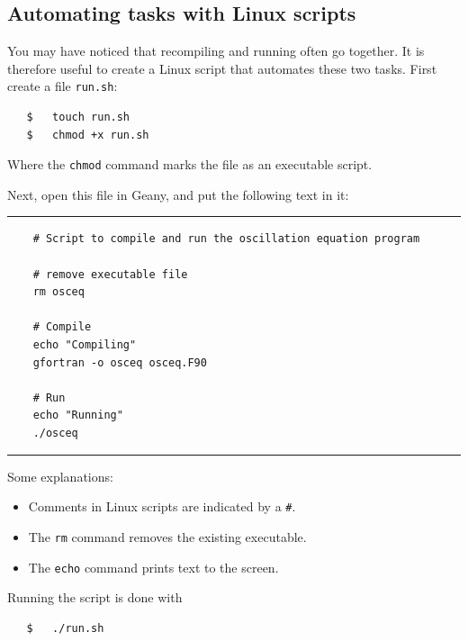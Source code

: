 \documentclass[a4paper]{article}
\begin{document}
\subsection{Automating tasks with Linux scripts}
%
\par
You may have noticed that recompiling and running often go together. It is therefore useful to create a Linux script that automates these two tasks. First create a file \texttt{run.sh}:
%
\begin{verbatim}
   $   touch run.sh
   $   chmod +x run.sh
\end{verbatim}
%
Where the \verb+chmod+ command marks the file as an executable script.
%
\par
Next, open this file in Geany, and put the following text in it:
%
{\vspace{10pt}\hrule\small\vspace*{-2pt}\begin{verbatim}
    # Script to compile and run the oscillation equation program
    
    # remove executable file
    rm osceq
    
    # Compile
    echo "Compiling"
    gfortran -o osceq osceq.F90
    
    # Run
    echo "Running"
    ./osceq
\end{verbatim}\hrule\vspace{5pt}}
%
%
Some explanations:
%
\begin{itemize}
	\item Comments in Linux scripts are indicated by a \verb+#+.
	\item The \verb+rm+ command removes the existing executable.
	\item The \verb+echo+ command prints text to the screen.
\end{itemize}
%
\par
Running the script is done with
%
\begin{verbatim}
   $   ./run.sh
\end{verbatim}
%
\end{document}

